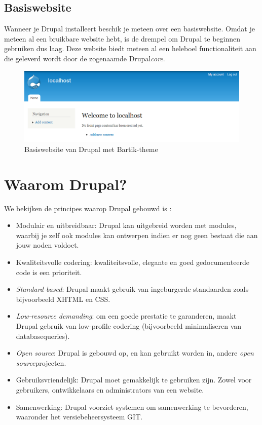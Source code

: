 \subsection{Basiswebsite}
Wanneer je Drupal installeert beschik je meteen over een basiswebsite. Omdat je meteen al een bruikbare website hebt, is de drempel om Drupal te beginnen gebruiken dus laag. Deze website biedt meteen al een heleboel functionaliteit aan die geleverd wordt door de zogenaamde Drupal\textit{core}. %
\begin{figure}[h]
\begin{center}
\includegraphics[keepaspectratio,width=1\textwidth]{fig/drupalBasiswebsite}
\vspace{-10pt}
\caption{Basiswebsite van Drupal met Bartik-theme}
\vspace{-30pt}
\end{center}
\end{figure}

\section{Waarom Drupal?}
We bekijken de principes waarop Drupal gebouwd is \cite{drupalMission}:
\begin{itemize}
\item Modulair en uitbreidbaar: Drupal kan uitgebreid worden met modules, waarbij je zelf ook modules kan ontwerpen indien er nog geen bestaat die aan jouw noden voldoet.
\item Kwaliteitsvolle codering: kwaliteitsvolle, elegante en goed gedocumenteerde code is een prioriteit.
\item \textit{Standard-based}: Drupal maakt gebruik van ingeburgerde standaarden zoals bijvoorbeeld XHTML en CSS.
\item \textit{Low-resource demanding}: om een goede prestatie te garanderen, maakt Drupal gebruik van low-profile codering (bijvoorbeeld minimaliseren van databasequeries).
\item \textit{Open source}: Drupal is gebouwd op, en kan gebruikt worden in, andere \textit{open source}projecten.
\item Gebruiksvriendelijk: Drupal moet gemakkelijk te gebruiken zijn. Zowel voor gebruikers, ontwikkelaars en administrators van een website.
\item Samenwerking: Drupal voorziet systemen om samenwerking te bevorderen, waaronder het versiebeheersysteem GIT.
\end{itemize}

